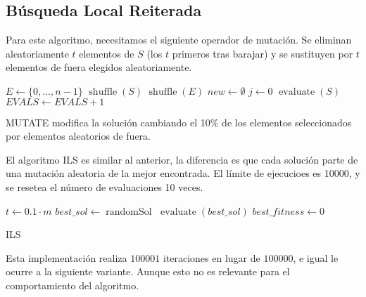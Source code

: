\documentclass{article}
\begin{document}
\subsection{Búsqueda Local Reiterada}

Para este algoritmo, necesitamos el siguiente operador de mutación. Se eliminan aleatoriamente $t$ elementos de $S$ (los $t$ primeros
tras barajar) y se sustituyen por $t$ elementos de fuera elegidos aleatoriamente.

\begin{algorithm}[H]
	\DontPrintSemicolon %
	$E\gets\{0,\ldots,n-1\}$\;
	$\operatorname{shuffle}(S)$\;
	$\operatorname{shuffle}(E)$\;
	$new\gets\emptyset$\;
	$j\gets 0$\;
	$\operatorname{evaluate}(S)$\;
	$EVALS\gets EVALS+1$\;
	\caption{{\sc MUTATE} modifica la solución cambiando el 10\% de los elementos seleccionados por elementos aleatorios
		de fuera.}
	\label{alg:mutate-ils}
\end{algorithm}

El algoritmo ILS es similar al anterior, la diferencia es que cada solución parte de una mutación aleatoria de la mejor encontrada.
El límite de ejecucioes es 10000, y se resetea el número de evaluaciones 10 veces.

\begin{algorithm}[H]
	\DontPrintSemicolon %
	$t\gets 0.1\cdot m$\;
	$best\_sol\gets \operatorname{randomSol}$\;
	$\operatorname{evaluate}(best\_sol)$\;
	$best\_fitness\gets 0$\;
	\;
	\caption{{\sc ILS}}
	\label{alg:ils}
\end{algorithm}

Esta implementación realiza $100001$ iteraciones en lugar de $100000$, e igual le ocurre a la siguiente variante. Aunque esto no
es relevante para el comportamiento del algoritmo.
\end{document}

